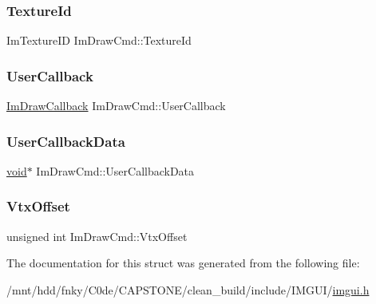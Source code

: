 \subsubsection{\texorpdfstring{Texture\+Id}{TextureId}}
{\footnotesize\ttfamily Im\+Texture\+ID Im\+Draw\+Cmd\+::\+Texture\+Id}

\mbox{\label{structImDrawCmd_ad26dac4e939f5c4bb892cbca0f9e3af8}} 
\subsubsection{\texorpdfstring{User\+Callback}{UserCallback}}
{\footnotesize\ttfamily \hyperlink{imgui_8h_a232a477233f9e3ab7640720bf94674de}{Im\+Draw\+Callback} Im\+Draw\+Cmd\+::\+User\+Callback}

\mbox{\label{structImDrawCmd_ae2f5a0baf4a0b25942237b8ce6adb42d}} 
\subsubsection{\texorpdfstring{User\+Callback\+Data}{UserCallbackData}}
{\footnotesize\ttfamily \hyperlink{imgui__impl__opengl3__loader_8h_ac668e7cffd9e2e9cfee428b9b2f34fa7}{void}$\ast$ Im\+Draw\+Cmd\+::\+User\+Callback\+Data}

\mbox{\label{structImDrawCmd_a604086d3c94a18b3a79f171ee37edabb}} 
\subsubsection{\texorpdfstring{Vtx\+Offset}{VtxOffset}}
{\footnotesize\ttfamily unsigned int Im\+Draw\+Cmd\+::\+Vtx\+Offset}



The documentation for this struct was generated from the following file\+:\begin{DoxyCompactItemize}
\item 
/mnt/hdd/fnky/\+C0de/\+C\+A\+P\+S\+T\+O\+N\+E/clean\+\_\+build/include/\+I\+M\+G\+U\+I/\hyperlink{imgui_8h}{imgui.\+h}\end{DoxyCompactItemize}
